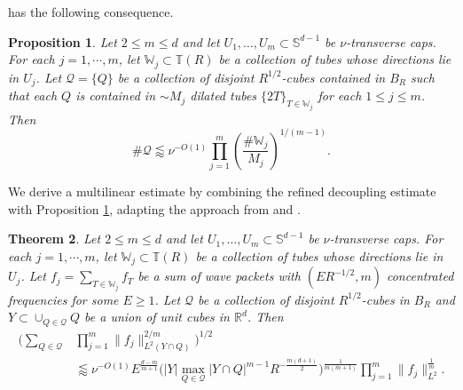 \documentclass[11pt]{amsart}
\newtheorem{theorem}{Theorem}[section]
\newtheorem{prop}[theorem]{Proposition}
\theoremstyle{definition}
\theoremstyle{remark}
\numberwithin{equation}{section}
\renewcommand{\S}{\mathbb{S}}
\newcommand{\R}{\mathbb{R}}
\newcommand{\W}{\mathbb{W}}
\newcommand{\T}{\mathbb{T}}
\newcommand{\less}{\lessapprox}
\begin{document}
 has the following consequence.
\begin{prop} \label{cor:multiKakeya}
	Let $2\leq m \leq d$ and let $U_1,\ldots,U_m\subset \S^{d-1}$ be $\nu$-transverse caps. 	For each $j=1,\cdots,m$, let $\W_j \subset \T(R)$ be a collection of tubes whose directions lie in $U_j$.  Let $\mathcal{Q} = \{ Q \}$ be a collection of  disjoint $R^{1/2}$-cubes contained in $B_R$ such that each $Q$ is contained in $\sim M_j$ dilated tubes $\{ 2T\}_{T\in \W_j}$ for each $1\leq j\leq m$. Then 
	\[ \# \mathcal{Q} \less \nu^{-O(1)} \prod_{j=1}^m \left( \frac{\# \W_j}{M_j} \right)^{1/(m-1)}. \]
\end{prop}


We derive a multilinear estimate by combining the refined decoupling estimate with Proposition \ref{cor:multiKakeya}, adapting the approach from \cite{DGLZ} and \cite{DemRefined}.
\begin{theorem}\label{thm:mulc_simplified}
		Let $2\leq m \leq d$ and let $U_1,\ldots,U_m\subset \S^{d-1}$ be $\nu$-transverse caps.	For each $j=1,\cdots,m$, let $\W_j \subset \T(R)$ be a collection of tubes whose directions lie in $U_j$. Let $f_j = \sum_{T\in \W_j} f_T$ be a sum of wave packets with $(ER^{-1/2},m)$ concentrated frequencies for some $E\geq 1$.  Let $\mathcal{Q}$ be a collection of disjoint $R^{1/2}$-cubes in $B_R$ and $Y \subset \cup_{Q\in \mathcal{Q}} Q$ be a union of unit cubes in $\R^d$. Then 
	\begin{align*}
		\Big(\sum_{Q \in \mathcal{Q}}
		&\prod_{j=1}^m \| f_j\|_{L^2(Y\cap Q)}^{2/m} \Big)^{1/2} \\ &\less \nu^{-O(1)}  E^{\frac{d-m}{m+1}} 
		 \Big( |Y| \max_{Q\in \mathcal{Q}} |Y\cap Q| ^{m-1}  
	R^{-\frac{m(d+1)}{2}} \Big)^{\frac{1}{m(m+1)}} \prod_{j=1}^m   \| f_j \|_{L^2}^{\frac{1}{m}}.
	\end{align*}
\end{theorem}
\end{document}
